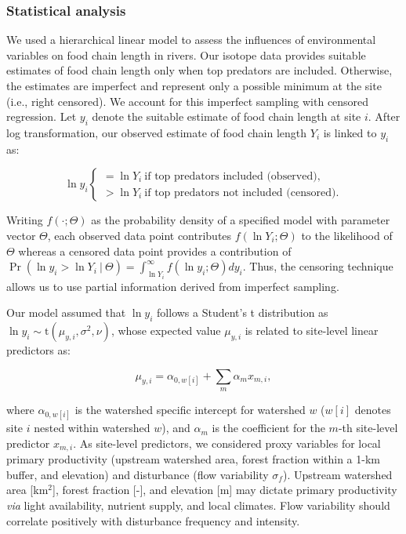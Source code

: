 \documentclass[11pt, class=article, crop=false]{standalone}
\begin{document}
\subsubsection{Statistical analysis}

We used a hierarchical linear model to assess the influences of environmental variables on food chain length in rivers.
Our isotope data provides suitable estimates of food chain length only when top predators are included.
Otherwise, the estimates are imperfect and represent only a possible minimum at the site (i.e., right censored).
We account for this imperfect sampling with censored regression.
Let $y_i$ denote the suitable estimate of food chain length at site $i$.
After log transformation, our observed estimate of food chain length $Y_i$ is linked to $y_i$ as:

\begin{equation}
    \ln y_i 
    \begin{cases}
        = \ln Y_i~\text{if top predators included (observed)},\\
        > \ln Y_i~\text{if top predators not included (censored).}
    \end{cases}
\end{equation}

Writing $f(\cdot;\Theta)$ as the probability density of a specified model with parameter vector $\Theta$, each observed data point contributes $f(\ln Y_i;\Theta)$ to the likelihood of $\Theta$ whereas a censored data point provides a contribution of $\Pr(\ln y_i > \ln Y_i~|~\Theta) = \int_{\ln Y_i}^{\infty} f(\ln y_i;\Theta) dy_i$.
Thus, the censoring technique allows us to use partial information derived from imperfect sampling.

Our model assumed that $\ln y_i$ follows a Student's t distribution as $\ln y_i \sim \mbox{t}(\mu_{y,i}, \sigma^2, \nu)$, whose expected value $\mu_{y,i}$ is related to site-level linear predictors as:

\begin{equation}
    \mu_{y,i} = \alpha_{0, w[i]} + \sum_m \alpha_m x_{m,i},
\end{equation}

where $\alpha_{0, w[i]}$ is the watershed specific intercept for watershed $w$ ($w[i]$ denotes site $i$ nested within watershed $w$), and $\alpha_m$ is the coefficient for the $m$-th site-level predictor $x_{m, i}$.
As site-level predictors, we considered proxy variables for local primary productivity (upstream watershed area, forest fraction within a 1-km buffer, and elevation) and disturbance (flow variability $\sigma_f$).
Upstream watershed area [km$^2$], forest fraction [-], and elevation [m] may dictate primary productivity \textit{via} light availability, nutrient supply, and local climates.
Flow variability should correlate positively with disturbance frequency and intensity.
\end{document}
